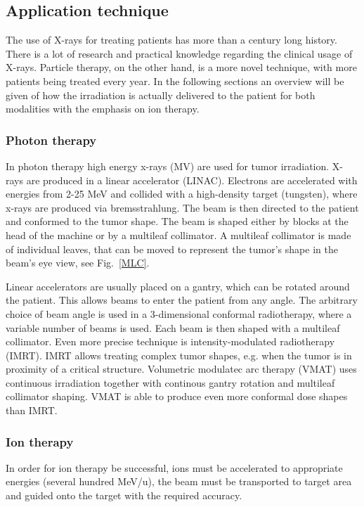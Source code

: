 \subsection{Application technique}

The use of X-rays for treating patients has more than a century long history. There is a lot of research and practical knowledge regarding the clinical usage of X-rays. Particle therapy, on the other hand, is a more novel technique, with
more patients being treated every year. In the following sections an overview will be given of how the irradiation is actually delivered to the patient for both modalities with the emphasis on ion therapy.

\subsubsection{Photon therapy}

In photon therapy high energy x-rays (MV) are used for tumor irradiation. X-rays are produced in a linear accelerator (LINAC). Electrons are accelerated with energies from 2-25 MeV and collided with a high-density target (tungsten), where
x-rays are produced via bremsstrahlung. The beam is then directed to the patient and conformed to the tumor shape. The beam is shaped either by blocks at the head of the machine or by a multileaf collimator. A multileaf collimator is made of
individual leaves, that can be moved to represent the tumor's shape in the beam's eye view, see Fig.~\ref{MLC}.

Linear accelerators are usually placed on a gantry, which can be rotated around the patient. This allows beams to enter the patient from any angle. 
The arbitrary choice of beam angle is used in a 3-dimensional conformal radiotherapy, where a variable number of beams is used. 
Each beam is then shaped with a multileaf collimator. Even more precise technique is intensity-modulated radiotherapy (IMRT). IMRT allows treating complex tumor shapes, e.g. when the tumor is in proximity of a critical structure.
Volumetric modulatec arc therapy (VMAT) uses continuous irradiation together with continous gantry rotation and multileaf collimator shaping. VMAT is able to produce even more conformal dose shapes than IMRT.

\subsubsection{Ion therapy}

In order for ion therapy be successful, ions must be accelerated to appropriate energies (several hundred MeV/u), the beam must be transported to target area and guided
onto the target with the required accuracy.

